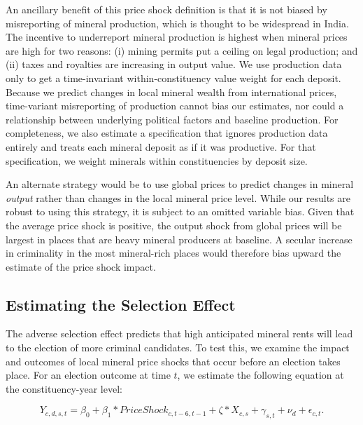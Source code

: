 \documentclass[12pt,letterpaper]{article}
\begin{document}
An ancillary benefit of this price shock definition is that it is not
biased by misreporting of mineral production, which is thought to be
widespread in India. The incentive to underreport mineral production
is highest when mineral prices are high for two reasons: (i) mining
permits put a ceiling on legal production; and (ii) taxes and
royalties are increasing in output value. We use production data only
to get a time-invariant within-constituency value weight for each
deposit. Because we predict changes in local mineral wealth from
international prices, time-variant misreporting of production cannot
bias our estimates, nor could a relationship between underlying
political factors and baseline production. For completeness, we also
estimate a specification that ignores production data entirely and
treats each mineral deposit as if it was productive. For that
specification, we weight minerals within constituencies by deposit
size.

An alternate strategy would be to use global prices to predict changes
in mineral \textit{output} rather than changes in the local mineral
price level. While our results are robust to using this strategy, it
is subject to an omitted variable bias. Given that the average price
shock is positive, the output shock from global prices will be largest
in places that are heavy mineral producers at baseline. A secular
increase in criminality in the most mineral-rich places would
therefore bias upward the estimate of the price shock impact.

\subsection{Estimating the Selection Effect}

The adverse selection effect predicts that high anticipated mineral
rents will lead to the election of more criminal candidates.  To test
this, we examine the impact and outcomes of local mineral price shocks
that occur before an election takes place.  For an election outcome at
time $t$, we estimate the following equation at the constituency-year
level:

\begin{equation}
  \label{eq:main}
  Y_{c,d,s,t} = \beta_0 + \beta_1 * PriceShock_{c,t-6,t-1} + 
  \zeta*X_{c,s} + \gamma_{s,t} + \nu_{d} + \epsilon_{c,t}\text{.}
\end{equation}
\end{document}
